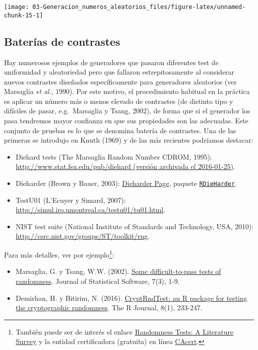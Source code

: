 \documentclass[
]{book}
\theoremstyle{break}
\theoremstyle{definition}
\theoremstyle{definition}
\theoremstyle{definition}
\theoremstyle{remark}
\begin{document}
\begin{center}\texttt{[image: 03-Generacion\_numeros\_aleatorios\_files/figure-latex/unnamed-chunk-15-1]} \end{center}

\hypertarget{baterias}{%
\subsection{Baterías de contrastes}\label{baterias}}

Hay numerosos ejemplos de generadores que pasaron diferentes test de uniformidad y aleatoriedad pero que fallaron estrepitosamente al considerar nuevos contrastes diseñados específicamente para generadores aleatorios (ver Marsaglia \emph{et al.}, 1990).
Por este motivo, el procedimiento habitual en la práctica es aplicar un número más o menos elevado de contrastes (de distinto tipo y difíciles de pasar, e.g.~Marsaglia y Tsang, 2002), de forma que si el generador los pasa tendremos mayor confianza en que sus propiedades son las adecuadas.
Este conjunto de pruebas es lo que se denomina batería de contrastes. Una de las primeras se introdujo en Knuth (1969) y de las más recientes podríamos destacar:

\begin{itemize}
\item
  Diehard tests (The Marsaglia Random Number CDROM, 1995):
  \href{https://web.archive.org/web/20160125103112/http://stat.fsu.edu/pub/diehard}{http://www.stat.fsu.edu/pub/diehard (versión archivada el 2016-01-25)}.
\item
  Dieharder (Brown y Bauer, 2003):
  \href{https://webhome.phy.duke.edu/~rgb/General/dieharder.php}{Dieharder Page},
  paquete \href{https://github.com/eddelbuettel/rdieharder}{\texttt{RDieHarder}}.
\item
  TestU01 (L'Ecuyer y Simard, 2007):
  \url{http://simul.iro.umontreal.ca/testu01/tu01.html}.
\item
  NIST test suite (National Institute of Standards and Technology, USA, 2010):
  \url{http://csrc.nist.gov/groups/ST/toolkit/rng}.
\end{itemize}

Para más detalles, ver por ejemplo\footnote{También puede ser de interés el enlace \href{http://www.ciphersbyritter.com/RES/RANDTEST.HTM}{Randomness Tests: A Literature Survey} y la entidad certificadora (gratuita) en línea \href{http://www.cacert.at/random}{CAcert}.}:

\begin{itemize}
\item
  Marsaglia, G. y Tsang, W.W. (2002). \href{http://www.jstatsoft.org/v07/i03}{Some difficult-to-pass tests of randomness}. Journal of Statistical Software, 7(3), 1-9.
\item
  Demirhan, H. y Bitirim, N. (2016). \href{https://journal.r-project.org/archive/2016/RJ-2016-016/index.html}{CryptRndTest: an R package for testing the cryptographic randomness}.
  The R Journal, 8(1), 233-247.
\end{itemize}
\end{document}
